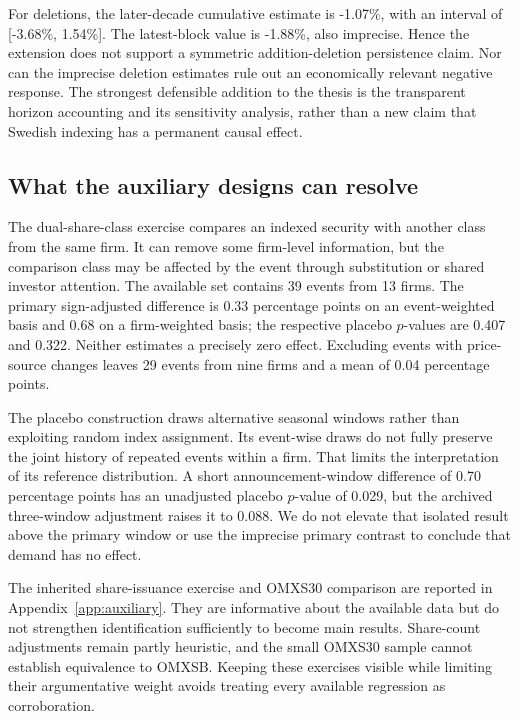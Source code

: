 For deletions, the later-decade cumulative estimate is -1.07\%, with an interval of [-3.68\%, 1.54\%]. The latest-block value is -1.88\%, also imprecise. Hence the extension does not support a symmetric addition-deletion persistence claim. Nor can the imprecise deletion estimates rule out an economically relevant negative response. The strongest defensible addition to the thesis is the transparent horizon accounting and its sensitivity analysis, rather than a new claim that Swedish indexing has a permanent causal effect.

\subsection{What the auxiliary designs can resolve}

The dual-share-class exercise compares an indexed security with another class from the same firm. It can remove some firm-level information, but the comparison class may be affected by the event through substitution or shared investor attention. The available set contains 39 events from 13 firms. The primary sign-adjusted difference is 0.33 percentage points on an event-weighted basis and 0.68 on a firm-weighted basis; the respective placebo $p$-values are 0.407 and 0.322. Neither estimates a precisely zero effect. Excluding events with price-source changes leaves 29 events from nine firms and a mean of 0.04 percentage points.

The placebo construction draws alternative seasonal windows rather than exploiting random index assignment. Its event-wise draws do not fully preserve the joint history of repeated events within a firm. That limits the interpretation of its reference distribution. A short announcement-window difference of 0.70 percentage points has an unadjusted placebo $p$-value of 0.029, but the archived three-window adjustment raises it to 0.088. We do not elevate that isolated result above the primary window or use the imprecise primary contrast to conclude that demand has no effect.

The inherited share-issuance exercise and OMXS30 comparison are reported in Appendix~\ref{app:auxiliary}. They are informative about the available data but do not strengthen identification sufficiently to become main results. Share-count adjustments remain partly heuristic, and the small OMXS30 sample cannot establish equivalence to OMXSB. Keeping these exercises visible while limiting their argumentative weight avoids treating every available regression as corroboration.
\FloatBarrier
